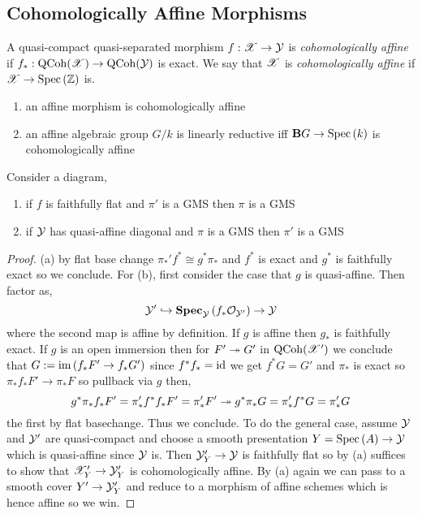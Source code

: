 \documentclass[12pt]{article}
\begin{document}
\subsection{Cohomologically Affine Morphisms}

\begin{defn}
A quasi-compact quasi-separated morphism $f : \mathscr{X} \to \mathcal{Y}$ is \textit{cohomologically affine} if $f_* : \mathrm{QCoh}(\mathscr{X}) \to \mathrm{QCoh}(\mathcal{Y})$ is exact. We say that $\mathscr{X}$ is \textit{cohomologically affine} if $\mathscr{X} \to \mathrm{Spec}\left( \mathbb{Z} \right)$ is.
\end{defn}

\begin{example}
\begin{enumerate}
\item an affine morphism is cohomologically affine
\item an affine algebraic group $G / k$ is linearly reductive iff $\mathbf{B} G \to \mathrm{Spec}\left( k \right)$ is cohomologically affine
\end{enumerate}
\end{example}

\begin{lemma}
Consider a diagram,
\begin{center}
\end{center}

\begin{enumerate}
\item if $f$ is faithfully flat and $\pi'$ is a GMS then $\pi$ is a GMS
\item if $\mathcal{Y}$ has quasi-affine diagonal and $\pi$ is a GMS then $\pi'$ is a GMS
\end{enumerate}
\end{lemma}

\begin{proof}
(a) by flat base change $\pi_*' f^* \cong g^* \pi_*$ and $f^*$ is exact and $g^*$ is faithfully exact so we conclude. For (b), first consider the case that $g$ is quasi-affine. Then factor as,
\[ \mathcal{Y}' \hookrightarrow \mathbf{Spec}_{\mathcal{Y}}\left( f_* \mathcal{O}_{\mathcal{Y}'} \right) \to \mathcal{Y} \]
where the second map is affine by definition. If $g$ is affine then $g_*$ is faithfully exact. If $g$ is an open immersion then for $F' \twoheadrightarrow G'$ in $\mathrm{QCoh}(\mathscr{X}')$ we conclude that $G := \operatorname{\mathrm{im}}{(f_* F' \to f_* G')}$ since $f^* f_* = \mathrm{id}$ we get $f^* G = G'$ and $\pi_*$ is exact so $\pi_* f_* F' \to \pi_* F$ so pullback via $g$ then,
\[ g^* \pi_* f_* F' = \pi_*' f^* f_* F' = \pi'_* F' \twoheadrightarrow g^* \pi_* G = \pi'_* f^* G = \pi_*' G \]
the first by flat basechange. Thus we conclude. To do the general case, assume $\mathcal{Y}$ and $\mathcal{Y}'$ are quasi-compact and choose a smooth presentation $Y = \mathrm{Spec}\left( A \right) \to \mathcal{Y}$ which is quasi-affine since $\mathcal{Y}$ is. Then $\mathcal{Y}'_Y \to \mathcal{Y}$ is faithfully flat so by (a) suffices to show that $\mathscr{X}'_Y \to \mathcal{Y}'_Y$ is cohomologically affine. By (a) again we can pass to a smooth cover $Y' \to \mathcal{Y}'_{Y}$ and reduce to a morphism of affine schemes which is hence affine so we win. 
\end{proof}
\end{document}
